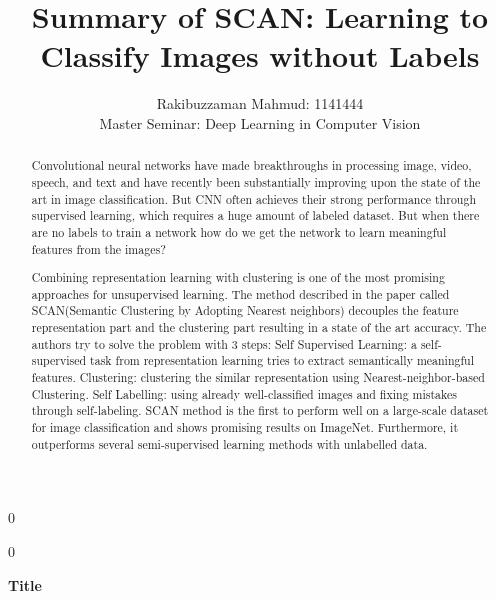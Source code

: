 \documentclass[12pt]{article}
\newcommand{\blind}{0}
\begin{document}
{\fontsize{2.5}{4}\selectfont}
%




\blind
{
  \title{\bf 
 Summary of SCAN: Learning to Classify Images without Labels
}
  \author{Rakibuzzaman Mahmud: 1141444{}\\
    Master Seminar: Deep Learning in Computer Vision\\
}
  \maketitle
} \fi

\blind
{
  \bigskip
  \bigskip
  \bigskip
  \begin{center}
    {\LARGE\bf Title}
\end{center}
  \medskip
} \fi

 \renewcommand{\abstractname}{Overview}

\bigskip
\begin{abstract}

Convolutional neural networks have made breakthroughs in processing image, video, speech, and text and have recently been substantially improving upon the state of the art in image classification. But CNN often achieves their strong performance through supervised learning, which requires a huge amount of labeled dataset. But when there are no labels to train a network how do we get the network to learn meaningful features from the images? 

Combining representation learning with clustering is one of the most promising approaches for unsupervised learning.  The method described in the paper called SCAN(Semantic Clustering by Adopting Nearest neighbors) decouples the feature representation part and the clustering part resulting in a state of the art accuracy. The authors try to solve the problem with 3 steps: 
Self Supervised Learning: a self-supervised task from representation learning tries to extract semantically meaningful features. Clustering: clustering the similar representation using Nearest-neighbor-based Clustering. Self Labelling: using already well-classified images and fixing mistakes through self-labeling. SCAN method is the first to perform well on a large-scale dataset for image classification and shows promising results on ImageNet. Furthermore, it outperforms several semi-supervised learning methods with unlabelled data.

\end{abstract}
\end{document}
